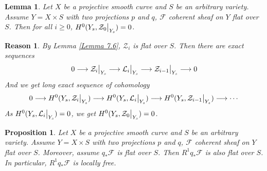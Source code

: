 \documentclass{ctexart}
\newtheorem{proposition}{Proposition}[section]
\newtheorem{lemma}{Lemma}[section]
\newtheorem{reason}{Reason}[section]
\begin{document}
\begin{lemma}
    Let $X$ be a projective smooth curve and $S$ be an arbitrary variety.
    Assume $Y = X \times S$ with two projections $p$ and $q$, $\mathcal{F}$ coherent sheaf on $Y$ flat over $S$.
    Then for all $i \ge 0$, $H^{0}(Y_{s}, \mathcal{Z}_{0}\big{|}_{Y_{s}}) = 0$.
    \label{Lemma 7.7}
\end{lemma}
\begin{reason}
    By Lemma \ref{Lemma 7.6}, $\mathcal{Z}_{i}$ is flat over $S$.
    Then there are exact sequences
    \begin{equation}
        0 \longrightarrow \mathcal{Z}_{i}\big{|}_{Y_{s}} \longrightarrow \mathcal{L}_{i}\big{|}_{Y_{s}} \longrightarrow \mathcal{Z}_{i - 1}\big{|}_{Y_{s}} \longrightarrow 0
        \label{equation:exact_sequence_with_Z_exact}
    \end{equation}
    And we get long exact sequence of cohomology
    \begin{equation}
        0 \longrightarrow H^{0}(Y_{s}, \mathcal{Z}_{i}\big{|}_{Y_{s}}) \longrightarrow H^{0}(Y_{s}, \mathcal{L}_{i}\big{|}_{Y_{s}}) \longrightarrow H^{0}(Y_{s}, \mathcal{Z}_{i - 1}\big{|}_{Y_{s}}) \longrightarrow \cdots
    \end{equation}
    As $H^{0}(Y_{s}, \mathcal{L}_{i}\big{|}_{Y_{s}}) = 0$, we get $H^{0}(Y_{s}, \mathcal{Z}_{0}\big{|}_{Y_{s}}) = 0$.
\end{reason}
\begin{proposition}
    Let $X$ be a projective smooth curve and $S$ be an arbitrary variety.
    Assume $Y = X \times S$ with two projections $p$ and $q$, $\mathcal{F}$ coherent sheaf on $Y$ flat over $S$.
    Moreover, assume $q_{\ast}\mathcal{F}$ is flat over $S$.
    Then $R^{1}q_{\ast}\mathcal{F}$ is also flat over $S$.
    In particular, $R^{1}q_{\ast}\mathcal{F}$ is locally free.
    \label{Proposition 7.3}
\end{proposition}
\end{document}
